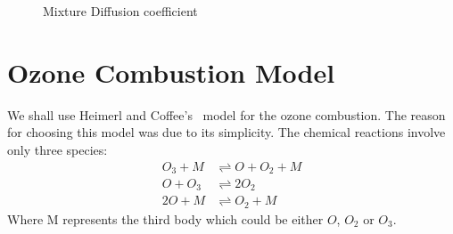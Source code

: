 \begin{figure}[H]
     \caption{Mixture Diffusion coefficient}
\end{figure}

 \section{Ozone Combustion Model} \label{sec:ozone-data}
We shall use Heimerl and Coffee's~\cite{Heimerl} model for the ozone combustion. The reason for choosing this model was due to its
simplicity. The chemical reactions involve only three species:
%
\begin{equation}\label{eq:ozone-mech}
\begin{aligned}
  O_3 + M &\rightleftharpoons O + O_2 + M\\
  O + O_3 &\rightleftharpoons 2O_2\\
  2O + M &\rightleftharpoons O_2 + M
\end{aligned}
\end{equation}
%
Where M represents the third body which could be either $O$,
$O_2$ or $O_3$.

